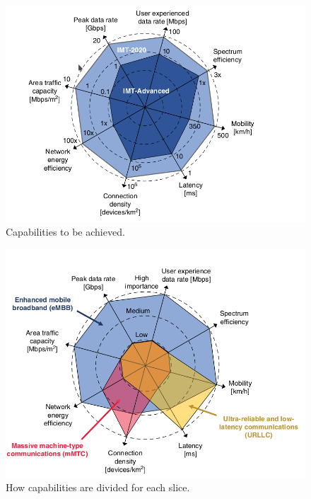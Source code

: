 \documentclass[a4paper,12pt]{report} %
\begin{document}
\begin{figure}[h]
\centering
\includegraphics[scale=0.4]{pics/capabilities1.png}
\caption{Capabilities to be achieved. \cite{al20185g}} 
\label{cap1}
\end{figure}
\begin{figure}[H]
\centering
\includegraphics[scale=0.4]{pics/capabilities2.png}
\caption{How capabilities are divided for each slice. \cite{al20185g}} 
\label{cap2}
\end{figure}




\newpage
\end{document}
